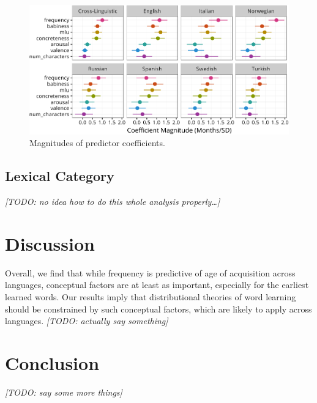 \documentclass[10pt, letterpaper]{article}
\newenvironment{CodeChunk}{}{}
\begin{document}
\begin{CodeChunk}
\begin{figure}[tb]

{\centering \includegraphics{figs/coefs-1} 

}

\caption[Magnitudes of predictor coefficients]{Magnitudes of predictor coefficients.}\label{fig:coefs}
\end{figure}
\end{CodeChunk}

\subsection{Lexical Category}\label{lexical-category}

\emph{{[}TODO: no idea how to do this whole analysis
properly\ldots{}{]}}

\newpage

\section{Discussion}\label{discussion}

Overall, we find that while frequency is predictive of age of
acquisition across languages, conceptual factors are at least as
important, especially for the earliest learned words. Our results imply
that distributional theories of word learning should be constrained by
such conceptual factors, which are likely to apply across languages.
\emph{{[}TODO: actually say something{]}}

\newpage

\section{Conclusion}\label{conclusion}

\emph{{[}TODO: say some more things{]}}
\end{document}
